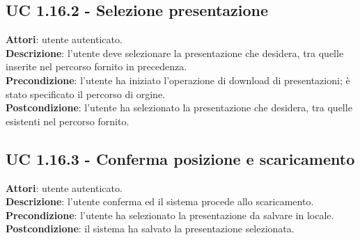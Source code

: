 	\subsection{UC 1.16.2 - Selezione presentazione}{
		\label{uc1.16.2}
		\textbf{Attori}: utente autenticato. \\
		\textbf{Descrizione}: l'utente deve selezionare la presentazione che desidera, tra quelle inserite nel percorso fornito in precedenza. \\
		\textbf{Precondizione}: l'utente ha iniziato l'operazione di download di presentazioni; è stato specificato il percorso di orgine.	\\
		\textbf{Postcondizione}: l'utente ha selezionato la presentazione che desidera, tra quelle esistenti nel percorso fornito.	\\
		}
	\subsection{UC 1.16.3 - Conferma posizione e scaricamento}{
		\label{uc1.16.3}
		\textbf{Attori}: utente autenticato. \\
		\textbf{Descrizione}: l'utente conferma ed il sistema procede allo scaricamento. \\
		\textbf{Precondizione}: l'utente ha selezionato la presentazione da salvare in locale.	\\
		\textbf{Postcondizione}: il sistema ha salvato la presentazione selezionata.	\\
		}
